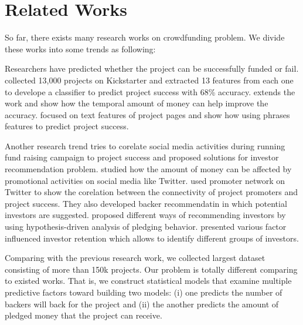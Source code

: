 \section{Related Works}
So far, there exists many research works on crowdfunding problem. We divide these works into some trends as following:

Researchers have predicted whether the project can be successfully funded or fail. \cite{greenberg2015public} collected 13,000 projects on Kickstarter and extracted 13 features from each one to develope a classifier to predict project success with 68\% accuracy. \cite{Etter:2013} extends the work and show how the temporal amount of money can help improve the accuracy. \cite{Mitra:2014} focused on text features of project pages and show how using phrases features to predict project success.

Another research trend tries to corelate social media activities during running fund raising campaign to project success and proposed solutions for investor recommendation problem. \cite{lu:2014} studied how the amount of money can be  affected by promotional activities on social media like Twitter. \cite{Rakesh:2015} used promoter network on Twitter to show the corelation between the connectivity of project promoters and project success. They also developed backer recommendatin in which potential investors are suggested. \cite{an2014recommending} proposed different ways of recommending investors by using hypothesis-driven analysis of pledging behavior. \cite{althoff2015donor} presented various factor influenced investor retention which allows to identify different groups of investors.

Comparing with the previous research work, we collected largest dataset consisting of more than 150k projects. Our problem is totally different comparing to existed works. That is, we construct statistical models that examine multiple predictive factors toward building two models: (i) one predicts the number of backers will back for the project and (ii) the another predicts the amount of pledged money that the project can receive.
